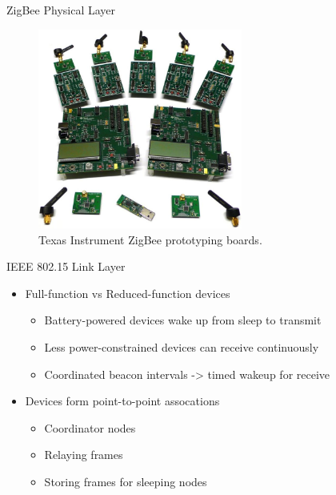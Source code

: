 \documentclass{beamer}
\begin{document}
\begin{frame}{ZigBee Physical Layer}
  \begin{figure}
  \includegraphics[width=0.6\textwidth]{ti_zigbee_devkit}
  \caption{Texas Instrument ZigBee prototyping boards.}
  \end{figure}
\end{frame}
    
\begin{frame}{IEEE 802.15 Link Layer}
  \begin{itemize}
    \item Full-function vs Reduced-function devices
	\begin{itemize}
  		\item Battery-powered devices wake up from sleep to transmit
  		\item Less power-constrained devices can receive continuously
  		\item Coordinated beacon intervals -> timed wakeup for receive
	\end{itemize}
	
  	\item Devices form point-to-point assocations
  	\begin{itemize}
  		\item Coordinator nodes
  		\item Relaying frames
  		\item Storing frames for sleeping nodes
  	\end{itemize}
  \end{itemize}
\end{frame}
\end{document}
